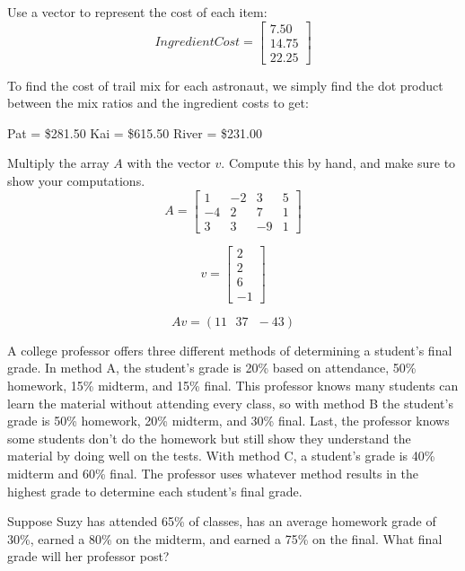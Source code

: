 Use a vector to represent the cost of each item:
$$IngredientCost = 
\begin{bmatrix}
7.50 \\
14.75 \\
22.25
\end{bmatrix}$$

To find the cost of trail mix for each astronaut, we simply find the dot product between the mix ratios and the ingredient costs to get:

Pat =  \$281.50 \newline
Kai =  \$615.50 \newline
River = \$231.00 \newline


\begin{Exercise}[title={Vector Matrix Multiplication}, label=vector-matrix-multiply01]
Multiply the array $A$ with the vector $v$. Compute this by hand, and make sure to show your computations. 
$$A = \begin{bmatrix}
1 & -2 & 3 & 5  \\
-4 & 2 & 7 & 1 \\
3 & 3  & -9 & 1
\end{bmatrix}$$

$$v = 
\begin{bmatrix}
 2 \\
 2 \\
 6 \\
 -1
 \end{bmatrix}$$
\end{Exercise}

\begin{Answer}[ref=vector-matrix-multiply01]
$$Av = (11 \text{ }37 \text{ } -43)$$
\end{Answer}

\begin{Exercise}[title = {Using Vector Matrix Multiplication}, label = vmm02]
A college professor offers three different methods of determining a student's final grade. In method A, the student's grade is 20\% based on attendance, 50\% homework, 15\% midterm, and 15\% final. This professor knows many students can learn the material without attending every class, so with method B the student's grade is 50\% homework, 20\% midterm, and 30\% final. Last, the professor knows some students don't do the homework but still show they understand the material by doing well on the tests. With method C, a student's grade is 40\% midterm and 60\% final. The professor uses whatever method results in the highest grade to determine each student's final grade. 

Suppose Suzy has attended 65\% of classes, has an average homework grade of 30\%, earned a 80\% on the midterm, and earned a 75\% on the final. What final grade will her professor post?
\end{Exercise}

